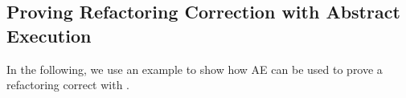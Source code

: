 
\subsection{Proving Refactoring Correction with Abstract Execution}

In the following, we use an example to show how AE can be used to prove a refactoring correct with \Refinity{}. 

